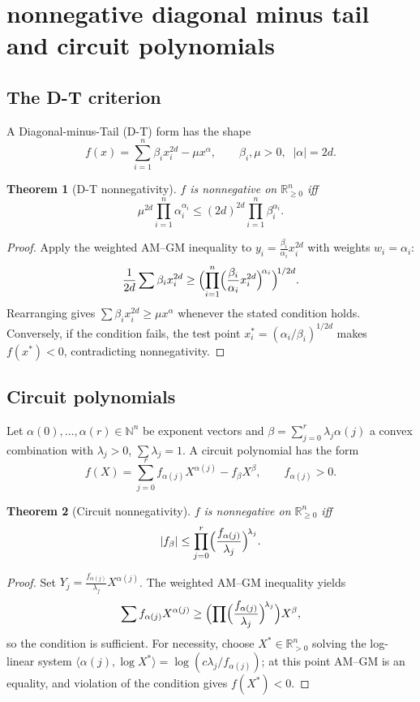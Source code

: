 \documentclass{amsart}
\newtheorem{thm}{Theorem}[section]
\theoremstyle{definition}
\numberwithin{equation}{section}
\newcommand{\reals}{\mathbb{R}}
\newcommand{\naturals}{\mathbb{N}}
\begin{document}
\section{nonnegative diagonal minus tail and circuit polynomials}
\label{sec:dt-circuit}

\subsection{The D-T criterion}

A Diagonal-minus-Tail (D-T) form has the shape
\[
f(x)=\sum_{i=1}^n\beta_i x_i^{2d}-\mu x^\alpha,
\qquad
\beta_i,\mu>0,\;\;|\alpha|=2d.
\]

\begin{thm}[D-T nonnegativity]\label{thm:dt-psd}
$f$ is nonnegative on $\reals_{\ge0}^n$ iff
\[
\mu^{2d}\prod_{i=1}^n\alpha_i^{\alpha_i}
\le(2d)^{2d}\prod_{i=1}^n\beta_i^{\alpha_i}.
\]
\end{thm}

\begin{proof}
Apply the weighted AM--GM inequality to
$y_i=\frac{\beta_i}{\alpha_i}x_i^{2d}$ with weights $w_i=\alpha_i$:
\[
\frac{1}{2d}\sum\beta_i x_i^{2d}
\ge\Bigl(\prod_{i=1}^n\Bigl(\frac{\beta_i}{\alpha_i}x_i^{2d}\Bigr)^{\!\alpha_i}\Bigr)^{\!1/2d}.
\]
Rearranging gives $\sum\beta_i x_i^{2d}\ge\mu x^\alpha$ whenever the stated
condition holds.  Conversely, if the condition fails, the test point
$x_i^*=(\alpha_i/\beta_i)^{1/2d}$ makes $f(x^*)<0$, contradicting
nonnegativity.
\end{proof}

\subsection{Circuit polynomials}

Let $\alpha(0),\dots,\alpha(r)\in\naturals^n$ be exponent vectors and
$\beta=\sum_{j=0}^r\lambda_j\alpha(j)$ a convex combination with
$\lambda_j>0$, $\sum\lambda_j=1$.  A circuit polynomial has the form
\[
f(X)=\sum_{j=0}^r f_{\alpha(j)}X^{\alpha(j)}-f_\beta X^\beta,
\qquad f_{\alpha(j)}>0.
\]

\begin{thm}[Circuit nonnegativity]\label{thm:circuit-psd}
$f$ is nonnegative on $\reals_{\ge0}^n$ iff
\[
|f_\beta|\le\prod_{j=0}^r\Bigl(\frac{f_{\alpha(j)}}{\lambda_j}\Bigr)^{\!\lambda_j}.
\]
\end{thm}

\begin{proof}
Set $Y_j=\frac{f_{\alpha(j)}}{\lambda_j}X^{\alpha(j)}$.  The weighted AM--GM
inequality yields
\[
\sum f_{\alpha(j)}X^{\alpha(j)}
\ge\Bigl(\prod\Bigl(\frac{f_{\alpha(j)}}{\lambda_j}\Bigr)^{\!\lambda_j}\Bigr)
X^\beta,
\]
so the condition is sufficient.  For necessity, choose
$X^*\in\reals_{>0}^n$ solving the log-linear system
$\langle\alpha(j),\log X^*\rangle=\log(c\lambda_j/f_{\alpha(j)})$; at this
point AM--GM is an equality, and violation of the condition gives
$f(X^*)<0$.
\end{proof}
\end{document}
